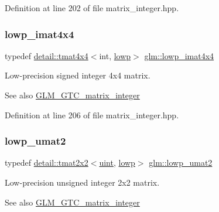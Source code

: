Definition at line 202 of file matrix\+\_\+integer.\+hpp.

\mbox{\label{group__gtc__matrix__integer_ga92339a0b053a721e3b88267e6d175014}} 
\subsubsection{\texorpdfstring{lowp\+\_\+imat4x4}{lowp\_imat4x4}}
{\footnotesize\ttfamily typedef \hyperlink{structglm_1_1detail_1_1tmat4x4}{detail\+::tmat4x4}$<$int, \hyperlink{namespaceglm_a0f04f086094c747d227af4425893f545ae161af3fc695e696ce3bf69f7332bc2d}{lowp}$>$ \hyperlink{group__gtc__matrix__integer_ga92339a0b053a721e3b88267e6d175014}{glm\+::lowp\+\_\+imat4x4}}

Low-\/precision signed integer 4x4 matrix. \begin{DoxySeeAlso}{See also}
\hyperlink{group__gtc__matrix__integer}{G\+L\+M\+\_\+\+G\+T\+C\+\_\+matrix\+\_\+integer} 
\end{DoxySeeAlso}


Definition at line 206 of file matrix\+\_\+integer.\+hpp.

\mbox{\label{group__gtc__matrix__integer_ga09df85e6b5e53f66a86d042e0633bfbc}} 
\subsubsection{\texorpdfstring{lowp\+\_\+umat2}{lowp\_umat2}}
{\footnotesize\ttfamily typedef \hyperlink{structglm_1_1detail_1_1tmat2x2}{detail\+::tmat2x2}$<$\hyperlink{group__core__precision_ga4fd29415871152bfb5abd588334147c8}{uint}, \hyperlink{namespaceglm_a0f04f086094c747d227af4425893f545ae161af3fc695e696ce3bf69f7332bc2d}{lowp}$>$ \hyperlink{group__gtc__matrix__integer_ga09df85e6b5e53f66a86d042e0633bfbc}{glm\+::lowp\+\_\+umat2}}

Low-\/precision unsigned integer 2x2 matrix. \begin{DoxySeeAlso}{See also}
\hyperlink{group__gtc__matrix__integer}{G\+L\+M\+\_\+\+G\+T\+C\+\_\+matrix\+\_\+integer} 
\end{DoxySeeAlso}


